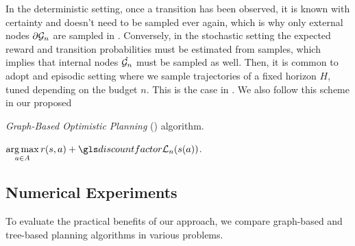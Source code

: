 In the deterministic setting, once a transition has been observed, it is known with certainty and doesn't need to be sampled ever again, which is why only external nodes ${\partial \mathcal{G}_n}$ are sampled in \GBOPD. Conversely, in the stochastic setting the expected reward and transition probabilities must be estimated from samples, which implies that internal nodes $\mathring{\mathcal{G}_n}$ must be sampled as well. Then, it is common to adopt and episodic setting where we sample trajectories of a fixed horizon $H$, tuned depending on the budget $n$. This is the case in  \citep[e.g.][]{Kearns02SS,Kocsis06UCT,Bubeck2010open,Feldman14BRUE,Leurent2019practical,MDPGapE2020}. We also follow this scheme in our proposed \GBOP

\begin{algorithm}[ht]
	\caption{\emph{Graph-Based Optimistic Planning} (\GBOP) algorithm.}
	\label{alg:gbop}
	\DontPrintSemicolon
	\Return $\displaystyle\argmax_{a\in A} r(s,a) + \discount \cL_n(s(a))$. 
\end{algorithm}

\subsection{Numerical Experiments}
\label{sec:experiments}

To evaluate the practical benefits of our approach, we compare graph-based and tree-based planning algorithms in various problems.

